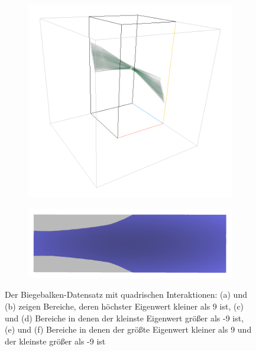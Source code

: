 \documentclass[a4paper,fontsize=12pt,toc=bib,halfparskip,ngerman]{scrartcl}
\begin{document}
\begin{figure}
\begin{subfigure}{0.4\textwidth}
		\includegraphics[width=\textwidth]{pictures/results/Beam/Beam_InvariantSpace3.png}
		\subcaption{}
		\label{BeamInvariant3}
	\end{subfigure}
	\hspace*{\fill}
	\begin{subfigure}{0.4\textwidth}
		\centering
		\includegraphics[width=\textwidth]{pictures/results/Beam/Beam_Object3.png}
		\subcaption{}
		\label{BeamObject3}
	\end{subfigure}
	\caption{Der Biegebalken-Datensatz mit quadrischen Interaktionen: (a) und (b) zeigen Bereiche, deren h\"ochster Eigenwert kleiner als 9 ist, (c) und (d) Bereiche in denen der kleinste Eigenwert gr\"o{\ss}er als -9 ist, (e) und (f) Bereiche in denen der gr\"o{\ss}te Eigenwert kleiner als 9 und der kleinste gr\"o{\ss}er als -9 ist}
	\label{BeamInteraction}
\end{figure}
\end{document}
